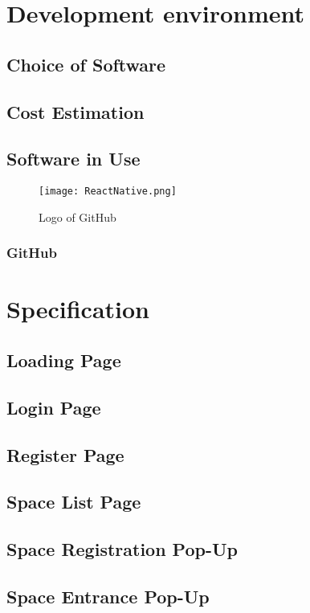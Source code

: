 \documentclass[conference]{IEEEtran}
\begin{document}
\section{Development environment}

\subsection{Choice of Software}
\subsection{Cost Estimation}

\subsection{Software in Use}
\begin{figure}[htbp]
\centerline{\texttt{[image: ReactNative.png]}}
\label{fig}
\caption{Logo of GitHub}
\end{figure}
\subsubsection{GitHub}

\section{Specification}

\subsection{Loading Page}
\subsection{Login Page}
\subsection{Register Page}
\subsection{Space List Page}
\subsection{Space Registration Pop-Up}
\subsection{Space Entrance Pop-Up}
\end{document}
